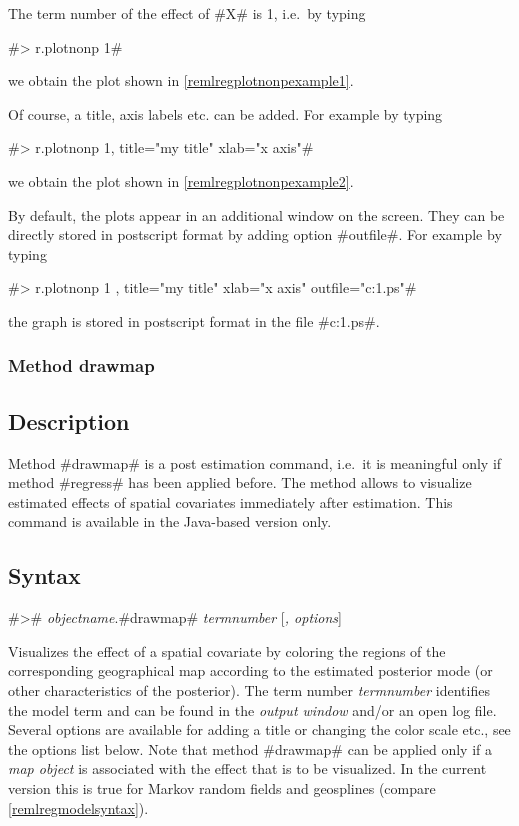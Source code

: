 The term number of the effect of #X# is 1, i.e.~by typing

#> r.plotnonp 1#

we obtain the plot shown in \autoref{remlregplotnonpexample1}.

Of course, a title, axis labels etc. can be added. For example by
typing

#> r.plotnonp 1, title="my title" xlab="x axis"#

we obtain the plot shown in \autoref{remlregplotnonpexample2}.

By default, the plots appear in an additional window on the
screen. They can be directly stored in postscript format by adding
option #outfile#. For example by typing

 #> r.plotnonp 1 , title="my title" xlab="x axis" outfile="c:\results\result1.ps"#

the graph is stored in postscript format in the file
#c:\results\result1.ps#.

\subsubsection{Method drawmap}
\label{remlregdrawmap} 
 

\subsection*{Description}

Method #drawmap# is a post estimation command, i.e.~it is
meaningful only if method #regress# has been applied before. The
method allows to visualize estimated effects of spatial covariates
immediately after estimation. This command is available in the
Java-based version only.

\subsection*{Syntax}

#># {\em objectname}.#drawmap# {\em termnumber} [{\em , options}]

Visualizes the effect of a spatial covariate by coloring the
regions of the corresponding geographical map according to the
estimated posterior mode (or other characteristics of the
posterior). The term number {\em termnumber} identifies the model
term and can be found in the {\em output window} and/or an open
log file. Several options are available for adding a title or
changing the color scale etc., see the options list below. Note
that method #drawmap# can be applied only if a {\em map object} is
associated with the effect that is to be visualized. In the
current version this is true for Markov random fields and
geosplines (compare \autoref{remlregmodelsyntax}).

